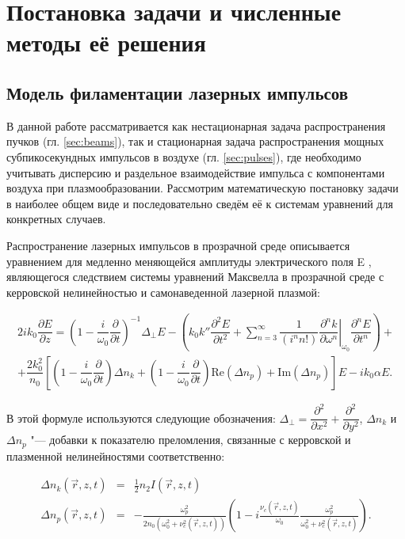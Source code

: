 \section{Постановка задачи и численные методы её решения}
\label{sec:model}

\subsection{Модель филаментации лазерных импульсов}

В данной работе рассматривается как нестационарная задача распространения пучков (гл. \ref{sec:beams}),
так и стационарная задача распространения мощных субпикосекундных импульсов в воздухе (гл. \ref{sec:pulses}),
где необходимо учитывать дисперсию и раздельное взаимодействие импульса с компонентами воздуха при плазмообразовании.
Рассмотрим математическую постановку задачи в наиболее общем виде и последовательно сведём её
к системам уравнений для конкретных случаев.


Распространение лазерных импульсов в прозрачной среде описывается уравнением
для медленно меняющейся амплитуды электрического поля E \cite{AkhmanovVislouhChirkin, VinogradovaRudenkoSuhorukov},
являющегося следствием системы уравнений Максвелла в прозрачной среде
с керровской нелинейностью и самонаведенной лазерной плазмой:

\begin{align}\label{ModelComplexEquation}
2 i k_0 \dfrac{\partial E}{\partial z} = \left(1-\dfrac{i}{\omega_0}\dfrac{\partial}{\partial t}\right)^{-1}\Delta_{\perp}E
- \left( k_0 k'' \dfrac{\partial^2 E}{\partial t^2}
+ \sum\limits_{n = 3}^{\infty} \dfrac{1}{(i^n n!)} \left.\dfrac{\partial^n k}{\partial \omega^n}\right|_{\omega_0} \dfrac{\partial^n E}{\partial t^n}\right) + \nonumber \\
+ \dfrac{2 k_0^2}{n_0}\left[\left(1-\dfrac{i}{\omega_0}\dfrac{\partial}{\partial t}\right)\Delta n_k +
\left(1-\dfrac{i}{\omega_0}\dfrac{\partial}{\partial t}\right)\mathrm{Re}(\Delta n_p) + \mathrm{Im}(\Delta n_p)\right]E - i k_0 \alpha E.
\end{align}

В этой формуле используются следующие обозначения: $\Delta_{\perp} = \dfrac{\partial^2}{\partial x^2} + \dfrac{\partial^2}{\partial y^2}$,
$\Delta n_k$ и $\Delta n_p$ "--- добавки к показателю преломления, связанные с керровской и плазменной нелинейностями соответственно:

\begin{eqnarray}\label{ModelNkerr}
\Delta n_k(\vec{r}, z, t) & = & \frac{1}{2}n_2 I(\vec{r}, z, t) \\
\Delta n_p(\vec{r}, z, t) & = & -\frac{\omega_p^2}{2 n_0 (\omega_0^2 + \nu_c^2(\vec{r}, z, t))} 
\left(1 - i \frac{\nu_c(\vec{r}, z, t)}{\omega_0} \frac{\omega_p^2}{\omega_0^2 + \nu_c^2(\vec{r}, z, t)}\right).
\end{eqnarray}

